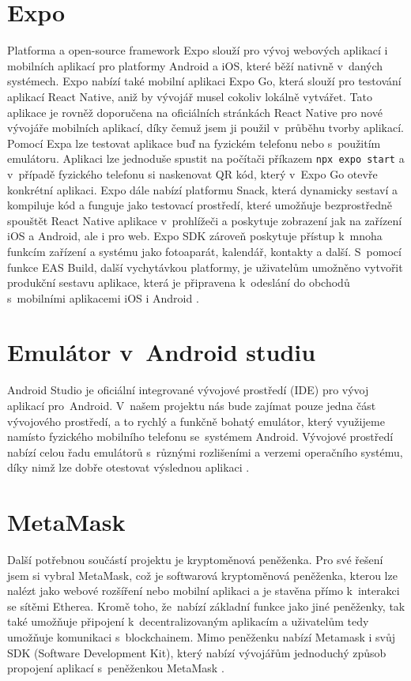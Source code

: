 \section{Expo}
Platforma a open-source framework Expo slouží pro vývoj webových aplikací i mobilních aplikací pro platformy Android a iOS, které běží nativně v~daných systémech. Expo nabízí také mobilní aplikaci Expo Go, která slouží pro testování aplikací React Native, aniž by vývojář musel cokoliv lokálně vytvářet. Tato aplikace je rovněž doporučena na oficiálních stránkách React Native pro nové vývojáře mobilních aplikací, díky čemuž jsem ji použil v~průběhu tvorby aplikací. Pomocí Expa lze testovat aplikace buď na fyzickém telefonu nebo s~použitím emulátoru. Aplikaci lze jednoduše spustit na počítači příkazem \texttt{npx expo start} a v~případě fyzického telefonu si naskenovat QR kód, který v~Expo Go otevře konkrétní aplikaci. Expo dále nabízí platformu Snack, která dynamicky sestaví a kompiluje kód a funguje jako testovací prostředí, které umožňuje bezprostředně spouštět React Native aplikace v~prohlížeči a poskytuje zobrazení jak na zařízení iOS a Android, ale i pro web. Expo SDK zároveň poskytuje přístup k~mnoha funkcím zařízení a systému jako fotoaparát, kalendář, kontakty a další. S~pomocí funkce EAS Build, další vychytávkou platformy, je uživatelům umožněno vytvořit produkční sestavu aplikace, která je připravena k~odeslání do obchodů s~mobilními aplikacemi iOS i Android \cite{expo}. 

\section{Emulátor v~Android studiu}
Android Studio je oficiální integrované vývojové prostředí (IDE) pro vývoj aplikací pro~Android. V~našem projektu nás bude zajímat pouze jedna část vývojového prostředí, a to rychlý a funkčně bohatý emulátor, který využijeme namísto fyzického mobilního telefonu se~systémem Android. Vývojové prostředí nabízí celou řadu emulátorů s~různými rozlišeními a verzemi operačního systému, díky nimž lze dobře otestovat výslednou aplikaci \cite{androidStudio}. 

\section{MetaMask}
Další potřebnou součástí projektu je kryptoměnová peněženka. Pro své řešení jsem si vybral MetaMask, což je softwarová kryptoměnová peněženka, kterou lze nalézt jako webové rozšíření nebo mobilní aplikaci a je stavěna přímo k~interakci se sítěmi Etherea. Kromě toho, že~nabízí základní funkce jako jiné peněženky, tak také umožňuje připojení k~decentralizovaným aplikacím a uživatelům tedy umožňuje komunikaci s~blockchainem. Mimo peněženku nabízí Metamask i svůj SDK (Software Development Kit), který nabízí vývojářům jednoduchý způsob propojení aplikací s~peněženkou MetaMask \cite{metamask}.

